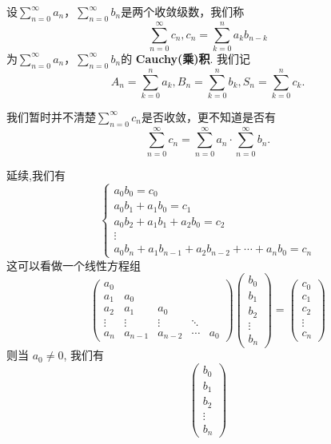 \documentclass[../../main.tex]{subfiles}
\begin{document}
\begin{definition}[Cauchy积]\label{definition:Cauchy积}
设\(\sum_{n = 0}^{\infty} a_n\)，\(\sum_{n = 0}^{\infty} b_n\)是两个收敛级数，我们称
\[
\sum_{n = 0}^{\infty} c_n, c_n = \sum_{k = 0}^{n} a_k b_{n - k}
\]
为\(\sum_{n = 0}^{\infty} a_n\)，\(\sum_{n = 0}^{\infty} b_n\)的 \textbf{Cauchy(乘)积}. 我们记
\[
A_n = \sum_{k = 0}^{n} a_k, B_n = \sum_{k = 0}^{n} b_k, S_n = \sum_{k = 0}^{n} c_k.
\]
\end{definition}
\begin{remark}
我们暂时并不清楚\(\sum_{n = 0}^{\infty} c_n\)是否收敛，更不知道是否有
\[
\sum_{n = 0}^{\infty} c_n = \sum_{n = 0}^{\infty} a_n \cdot \sum_{n = 0}^{\infty} b_n. 
\]
\end{remark}
\begin{conclusion}
延续,我们有
\[
\begin{cases}
a_0 b_0 = c_0 \\
a_0 b_1 + a_1 b_0 = c_1 \\
a_0 b_2 + a_1 b_1 + a_2 b_0 = c_2 \\
\vdots \\
a_0 b_n + a_1 b_{n-1} + a_2 b_{n-2} + \cdots + a_n b_0 = c_n
\end{cases}
\]
这可以看做一个线性方程组
\[
\begin{pmatrix}
a_0 \\
a_1 & a_0 \\
a_2 & a_1 & a_0 \\
\vdots & \vdots & \vdots & \ddots \\
a_n & a_{n-1} & a_{n-2} & \cdots & a_0
\end{pmatrix}
\begin{pmatrix}
b_0 \\
b_1 \\
b_2 \\
\vdots \\
b_n
\end{pmatrix}
=
\begin{pmatrix}
c_0 \\
c_1 \\
c_2 \\
\vdots \\
c_n
\end{pmatrix}
\]
则当 $a_0 \neq 0$, 我们有
\[
\begin{pmatrix}
b_0 \\
b_1 \\
b_2 \\
\vdots \\
b_n
\end{pmatrix}
\]
\end{conclusion}
\end{document}
